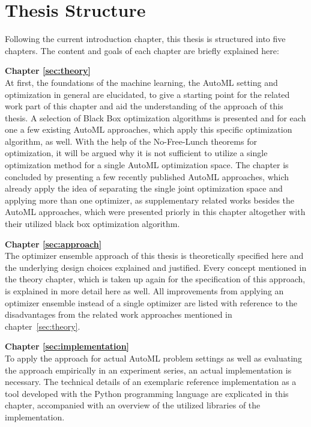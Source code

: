 \section{Thesis Structure}
\label{sec:intro:structure}
Following the current introduction chapter, this thesis is structured into five chapters.
The content and goals of each chapter are briefly explained here:

\textbf{Chapter \ref{sec:theory}} \\[0.2em]
At first, the foundations of the machine learning, the AutoML setting and optimization in general are elucidated, to give a starting point for the related work part of this chapter and aid the understanding of the approach of this thesis.
A selection of Black Box optimization algorithms is presented and for each one a few existing AutoML approaches, which apply this specific optimization algorithm, as well.\newline
With the help of the No-Free-Lunch theorems for optimization, it will be argued why it is not sufficient to utilize a single optimization method for a single AutoML optimization space.\newline
The chapter is concluded by presenting a few recently published AutoML approaches, which already apply the idea of separating the single joint optimization space and applying more than one optimizer, as supplementary related works besides the AutoML approaches, which were presented priorly in this chapter altogether with their utilized black box optimization algorithm.

\textbf{Chapter \ref{sec:approach}} \\[0.2em]
The optimizer ensemble approach of this thesis is theoretically specified here and the underlying design choices explained and justified.
Every concept mentioned in the theory chapter, which is taken up again for the specification of this approach, is explained in more detail here as well.\newline
All improvements from applying an optimizer ensemble instead of a single optimizer are listed with reference to the disadvantages from the related work approaches mentioned in chapter~\ref{sec:theory}.

\textbf{Chapter \ref{sec:implementation}} \\[0.2em]
To apply the approach for actual AutoML problem settings as well as evaluating the approach empirically in an experiment series, an actual implementation is necessary.
The technical details of an exemplaric reference implementation as a tool developed with the Python programming language are explicated in this chapter, accompanied with an overview of the utilized libraries of the implementation.

